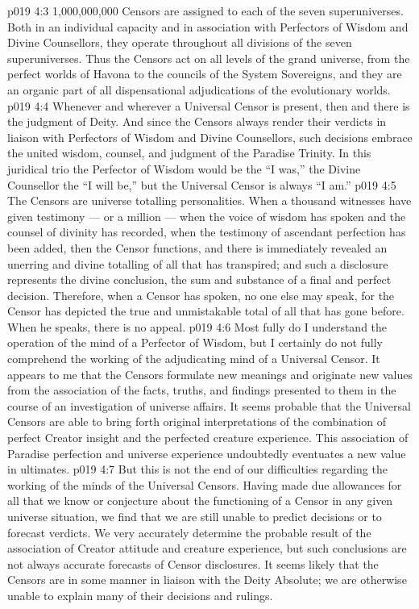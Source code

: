 \vs p019 4:3 1,000,000,000 Censors are assigned to each of the seven superuniverses. Both in an individual capacity and in association with Perfectors of Wisdom and Divine Counsellors, they operate throughout all divisions of the seven superuniverses. Thus the Censors act on all levels of the grand universe, from the perfect worlds of Havona to the councils of the System Sovereigns, and they are an organic part of all dispensational adjudications of the evolutionary worlds.
\vs p019 4:4 \pc Whenever and wherever a Universal Censor is present, then and there is the judgment of Deity. And since the Censors always render their verdicts in liaison with Perfectors of Wisdom and Divine Counsellors, such decisions embrace the united wisdom, counsel, and judgment of the Paradise Trinity. In this juridical trio the Perfector of Wisdom would be the “I was,” the Divine Counsellor the “I will be,” but the Universal Censor is always “I am.”
\vs p019 4:5 \pc The Censors are universe totalling personalities. When a thousand witnesses have given testimony --- or a million --- when the voice of wisdom has spoken and the counsel of divinity has recorded, when the testimony of ascendant perfection has been added, then the Censor functions, and there is immediately revealed an unerring and divine totalling of all that has transpired; and such a disclosure represents the divine conclusion, the sum and substance of a final and perfect decision. Therefore, when a Censor has spoken, no one else may speak, for the Censor has depicted the true and unmistakable total of all that has gone before. When he speaks, there is no appeal.
\vs p019 4:6 Most fully do I understand the operation of the mind of a Perfector of Wisdom, but I certainly do not fully comprehend the working of the adjudicating mind of a Universal Censor. It appears to me that the Censors formulate new meanings and originate new values from the association of the facts, truths, and findings presented to them in the course of an investigation of universe affairs. It seems probable that the Universal Censors are able to bring forth original interpretations of the combination of perfect Creator insight and the perfected creature experience. This association of Paradise perfection and universe experience undoubtedly eventuates a new value in ultimates.
\vs p019 4:7 But this is not the end of our difficulties regarding the working of the minds of the Universal Censors. Having made due allowances for all that we know or conjecture about the functioning of a Censor in any given universe situation, we find that we are still unable to predict decisions or to forecast verdicts. We very accurately determine the probable result of the association of Creator attitude and creature experience, but such conclusions are not always accurate forecasts of Censor disclosures. It seems likely that the Censors are in some manner in liaison with the Deity Absolute; we are otherwise unable to explain many of their decisions and rulings.
